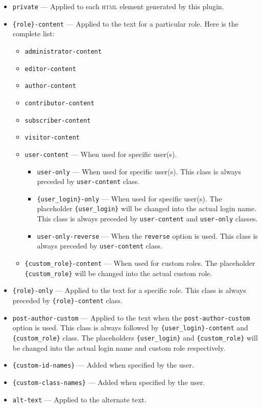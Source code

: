 \begin{itemize}
 \item \verb+private+ --- Applied to each \textsc{html} element generated by this
 plugin.
 \item \verb+{role}-content+ --- Applied to the text for a particular role. Here
 is the complete list:
 \begin{itemize}
  \item \verb+administrator-content+
  \item \verb+editor-content+
  \item \verb+author-content+
  \item \verb+contributor-content+
  \item \verb+subscriber-content+
  \item \verb+visitor-content+
  \item \verb+user-content+ --- When used for specific user(s).
  \begin{itemize}
   \item \verb+user-only+ --- When used for specific user(s). This class is
   always preceded by \verb+user-content+ class.
    \item \verb+{user_login}-only+ --- When used for specific user(s). The
    placeholder \verb+{user_login}+ will be changed into the actual login name.
    This class is always preceded by \verb+user-content+ and \verb+user-only+
    classes.
    \item \verb+user-only-reverse+ --- When the \verb+reverse+ option is used.
    This class is always preceded by \verb+user-content+ class.
  \end{itemize}
  \item \verb+{custom_role}-content+ --- When used for custom roles. The
  placeholder \verb+{custom_role}+ will be changed into the actual custom role.
  \end{itemize}
 \item \verb+{role}-only+ --- Applied to the text for a specific role. This
 class is always preceded by \verb+{role}-content+ class.
 \item \verb+post-author-custom+ --- Applied to the text when the
 \verb+post-author-custom+ option is used. This class is always followed by
 \verb+{user_login}-content+ and \verb+{custom_role}+ class. The placeholders
 \verb+{user_login}+ and \verb+{custom_role}+ will be changed into the actual
 login name and custom role respectively.
 \item \verb+{custom-id-names}+ --- Added when specified by the user.
 \item \verb+{custom-class-names}+ --- Added when specified by the user.
 \item \verb+alt-text+ --- Applied to the alternate text.
\end{itemize}

